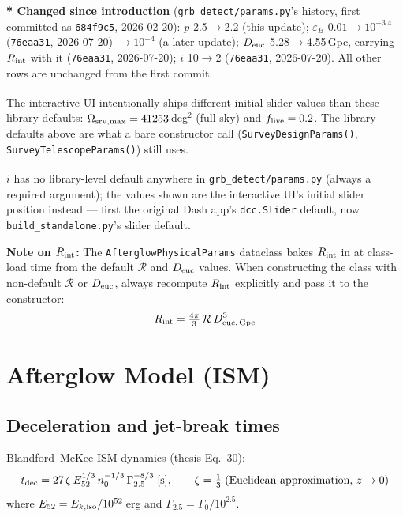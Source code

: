 \documentclass[11pt,a4paper]{article}
\begin{document}
\noindent\textbf{* Changed since introduction} (\texttt{grb\_detect/params.py}'s history, first
committed as \texttt{684f9c5}, 2026-02-20): $p$ 2.5$\to$2.2 (this update); $\varepsilon_B$
$0.01\to10^{-3.4}$ (\texttt{76eaa31}, 2026-07-20) $\to10^{-4}$ (a later update); $D_{\rm euc}$
5.28$\to$4.55\,Gpc, carrying $R_{\rm int}$ with it (\texttt{76eaa31}, 2026-07-20); $i$ 10$\to$2
(\texttt{76eaa31}, 2026-07-20). All other rows are unchanged from the first commit.

\noindent\textsuperscript{\dag} The interactive UI intentionally ships different initial slider
values than these library defaults: $\Omega_{\rm srv,max}=41253$\,deg$^2$ (full sky) and
$f_{\rm live}=0.2$. The library defaults above are what a bare constructor call
(\texttt{SurveyDesignParams()}, \texttt{SurveyTelescopeParams()}) still uses.

\noindent\textsuperscript{\ddag} $i$ has no library-level default anywhere in
\texttt{grb\_detect/params.py} (always a required argument); the values shown are the
interactive UI's initial slider position instead --- first the original Dash app's
\texttt{dcc.Slider} default, now \texttt{build\_standalone.py}'s slider default.

\noindent\textbf{Note on $R_{\rm int}$:} The \texttt{AfterglowPhysicalParams} dataclass bakes $R_{\rm int}$ in at class-load time from the default $\mathcal{R}$ and $D_{\rm euc}$ values.
When constructing the class with non-default $\mathcal{R}$ or $D_{\rm euc}$, always recompute $R_{\rm int}$ explicitly and pass it to the constructor:
\[
R_{\rm int} = \tfrac{4\pi}{3}\,\mathcal{R}\,D_{\rm euc,\,Gpc}^3
\]

\section{Afterglow Model (ISM)}

\subsection{Deceleration and jet-break times}

\noindent Blandford--McKee ISM dynamics (thesis Eq.~30):
\begin{equation}
t_{\rm dec} = 27\,\zeta\,E_{52}^{1/3}\,n_0^{-1/3}\,\Gamma_{2.5}^{-8/3}\;[\text{s}],
\qquad \zeta = \tfrac{1}{3}\;\text{(Euclidean approximation, }z\to0\text{)}
\end{equation}
where $E_{52}=E_{k,{\rm iso}}/10^{52}$\,erg and $\Gamma_{2.5}=\Gamma_0/10^{2.5}$.
\end{document}
